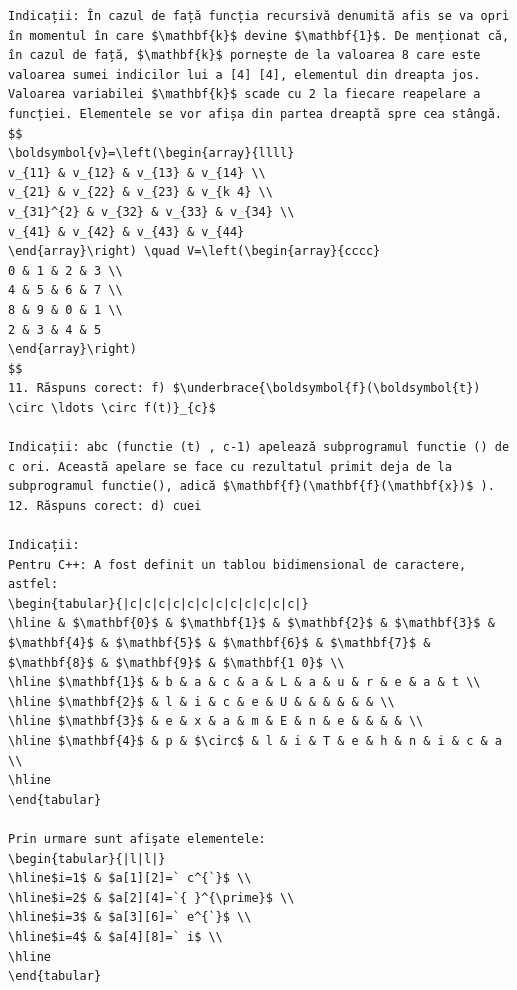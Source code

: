 \documentclass[10pt]{article}
\begin{document}
\begin{verbatim}
Indicații: În cazul de față funcția recursivă denumită afis se va opri în momentul în care $\mathbf{k}$ devine $\mathbf{1}$. De menționat că, în cazul de față, $\mathbf{k}$ pornește de la valoarea 8 care este valoarea sumei indicilor lui a [4] [4], elementul din dreapta jos.
Valoarea variabilei $\mathbf{k}$ scade cu 2 la fiecare reapelare a funcției. Elementele se vor afișa din partea dreaptă spre cea stângă.
$$
\boldsymbol{v}=\left(\begin{array}{llll}
v_{11} & v_{12} & v_{13} & v_{14} \\
v_{21} & v_{22} & v_{23} & v_{k 4} \\
v_{31}^{2} & v_{32} & v_{33} & v_{34} \\
v_{41} & v_{42} & v_{43} & v_{44}
\end{array}\right) \quad V=\left(\begin{array}{cccc}
0 & 1 & 2 & 3 \\
4 & 5 & 6 & 7 \\
8 & 9 & 0 & 1 \\
2 & 3 & 4 & 5
\end{array}\right)
$$
11. Răspuns corect: f) $\underbrace{\boldsymbol{f}(\boldsymbol{t}) \circ \ldots \circ f(t)}_{c}$

Indicații: abc (functie (t) , c-1) apelează subprogramul functie () de c ori. Această apelare se face cu rezultatul primit deja de la subprogramul functie(), adică $\mathbf{f}(\mathbf{f}(\mathbf{x})$ ).
12. Răspuns corect: d) cuei

Indicații:
Pentru C++: A fost definit un tablou bidimensional de caractere, astfel:
\begin{tabular}{|c|c|c|c|c|c|c|c|c|c|c|c|}
\hline & $\mathbf{0}$ & $\mathbf{1}$ & $\mathbf{2}$ & $\mathbf{3}$ & $\mathbf{4}$ & $\mathbf{5}$ & $\mathbf{6}$ & $\mathbf{7}$ & $\mathbf{8}$ & $\mathbf{9}$ & $\mathbf{1 0}$ \\
\hline $\mathbf{1}$ & b & a & c & a & L & a & u & r & e & a & t \\
\hline $\mathbf{2}$ & l & i & c & e & U & & & & & & \\
\hline $\mathbf{3}$ & e & x & a & m & E & n & e & & & & \\
\hline $\mathbf{4}$ & p & $\circ$ & l & i & T & e & h & n & i & c & a \\
\hline
\end{tabular}

Prin urmare sunt afişate elementele:
\begin{tabular}{|l|l|}
\hline$i=1$ & $a[1][2]=` c^{`}$ \\
\hline$i=2$ & $a[2][4]=`{ }^{\prime}$ \\
\hline$i=3$ & $a[3][6]=` e^{`}$ \\
\hline$i=4$ & $a[4][8]=` i$ \\
\hline
\end{tabular}


\end{verbatim}
\end{document}
